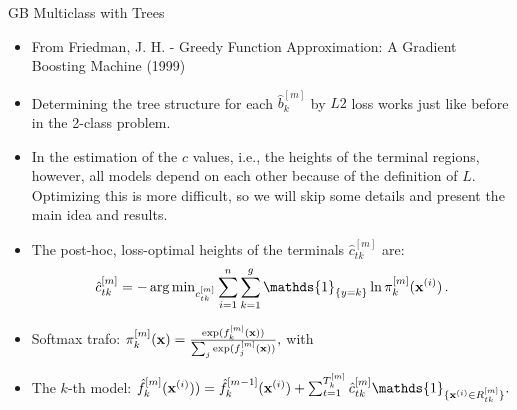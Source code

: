 \begin{vbframe}{GB Multiclass with Trees}

\begin{itemize}
  \item From Friedman, J. H. - Greedy Function Approximation: A Gradient Boosting Machine (1999)
  \item Determining the tree structure for each $\hat{b}^{[m]}_k$ by $L2$ loss works just like before in the 2-class problem.
\item In the estimation of the $c$ values, i.e., the heights of the terminal regions, however, all models depend on each other because of the definition
of $L$. Optimizing this is more difficult, so we will skip some details and present the main idea and results.
\end{itemize}

\framebreak

\begin{itemize}
  \item The post-hoc, loss-optimal heights of the terminals $\hat{c}_{tk}^{[m]}$ are:
  $$
  \hat{c}_{tk}^{[m]} = - \argmin_{c_{tk}^{[m]} } \sum_{i=1}^n \sum_{k=1}^g \mathds{1}_{\{y = k\}} \ln \pi_k^{[m]}(\xv^{(i)}) \,.
  $$
\item Softmax trafo: $\pi_k^{[m]}(\mathbf{x}) = \frac{\exp(f_k^{[m]}(\mathbf{x}))}{\sum_j \exp(f_j^{[m]}(\mathbf{x}))},$ with
\item The $k$-th model:
  $
  \hat{f}_k^{[m]}(\xv^{(i)})) = \hat{f}_k^{[m-1]}(\xv^{(i)}) + \sum_{t=1}^{T_k^{[m]}} \hat{c}_{tk}^{[m]} \mathds{1}_{\{\xv^{(i)} \in R_{tk}^{[m]}\}}.
  $

\end{itemize}







\end{vbframe}
